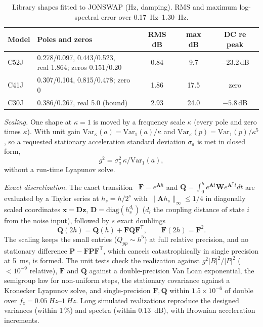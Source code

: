 \documentclass[conference]{IEEEtran}
\DeclareRobustCommand{\vct}[1]{\bm{#1}}
\DeclareRobustCommand{\mat}[1]{\bm{#1}}
\theoremstyle{bodysmall}
\begin{document}
\begin{table}[t]
\centering
\caption{Library shapes fitted to JONSWAP (Hz, damping). RMS and maximum
log-spectral error over \SIrange{0.17}{1.30}{Hz}.}
\label{tab:shapes}
\footnotesize
\setlength{\tabcolsep}{3pt}
\begin{adjustbox}{max width=\columnwidth}
\begin{tabular}{@{}llccc@{}}
\toprule
Model & Poles and zeros & RMS dB & max dB & DC re peak\\
\midrule
C52J & \makecell[l]{0.278/0.097, 0.443/0.523,\\ real 1.864; zeros 0.151/0.20} & 0.84 & 9.7 & $-23.2$\,dB\\
C41J & 0.307/0.104, 0.815/0.478; zero 0 & 1.86 & 17.5 & zero\\
C30J & 0.386/0.267, real 5.0 (bound) & 2.93 & 24.0 & $-5.8$\,dB\\
\bottomrule
\end{tabular}
\end{adjustbox}
\end{table}

\emph{Scaling.} One shape at $\kappa=1$ is moved by a frequency scale
$\kappa$ (every pole and zero times $\kappa$). With unit gain
$\mathrm{Var}_\kappa(a)=\mathrm{Var}_1(a)/\kappa$ and
$\mathrm{Var}_\kappa(p)=\mathrm{Var}_1(p)/\kappa^5$, so a requested
stationary acceleration standard deviation $\sigma_a$ is met in closed form,
\begin{equation}
g^2=\sigma_a^2\,\kappa/\mathrm{Var}_1(a),
\label{eq:scaling}
\end{equation}
without a run-time Lyapunov solve.

\emph{Exact discretization.} The exact transition~\cite{sarkka23}
$\mat{F}=e^{\mat{A}h}$ and
$\mat{Q}=\int_0^he^{\mat{A}t}\mat{W}e^{\mat{A}^{\mathsf T}t}dt$ are evaluated
by a Taylor series at $h_s=h/2^s$ with $\|\mat{A}h_s\|_\infty\le1/4$ in
diagonally scaled coordinates $\vct{x}=\mat{D}\vct{z}$,
$\mat{D}=\mathrm{diag}(h_s^{d_i})$ ($d_i$ the coupling distance of state $i$
from the noise input), followed by $s$ exact doublings
\begin{equation}
\mat{Q}(2h)=\mat{Q}(h)+\mat{F}\mat{Q}\mat{F}^{\mathsf T},\qquad
\mat{F}(2h)=\mat{F}^2.
\label{eq:doubling}
\end{equation}
The scaling keeps the small entries ($Q_{pp}\sim h^5$) at full relative
precision, and no stationary difference $\mat{P}-\mat{F}\mat{P}\mat{F}^{\mathsf T}$,
which cancels catastrophically in single precision at \SI{5}{ms}, is formed.
The unit tests check the realization against $g^2|B|^2/|P|^2$ ($<10^{-9}$
relative), $\mat{F}$ and $\mat{Q}$ against a double-precision Van Loan
exponential, the semigroup law for non-uniform steps, the stationary
covariance against a Kronecker Lyapunov solve, and single-precision
$\mat{F},\mat{Q}$ within $1.5\times10^{-6}$ of double over
$f_z=\SIrange{0.05}{1}{Hz}$. Long simulated realizations reproduce the
designed variances (within 1\,\%) and spectra (within \SI{0.13}{dB}), with
Brownian acceleration increments.
\end{document}
